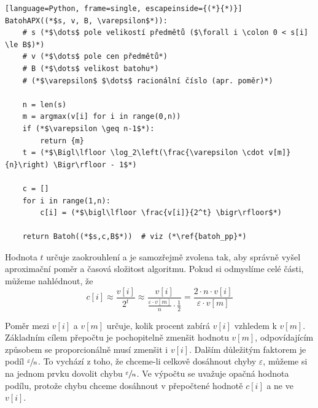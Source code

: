 \documentclass[11pt]{report} %
\numberwithin{equation}{section}
\begin{document}
\begin{minipage}{\linewidth}
	\label{batoh_apx}
	\begin{lstlisting}[language=Python, frame=single, escapeinside={(*}{*)}]
BatohAPX((*$s, v, B, \varepsilon$*)): 
	# s (*$\dots$ pole velikostí předmětů ($\forall i \colon 0 < s[i] \le B$)*)
	# v (*$\dots$ pole cen předmětů*)
	# B (*$\dots$ velikost batohu*)
	# (*$\varepsilon$ $\dots$ racionální číslo (apr. poměr)*)
	
	n = len(s)
	m = argmax(v[i] for i in range(0,n))
	if (*$\varepsilon \geq n-1$*):
		return {m}
	t = (*$\Bigl\lfloor \log_2\left(\frac{\varepsilon \cdot v[m]}{n}\right) \Bigr\rfloor - 1$*)
	
	c = []
	for i in range(1,n):
		c[i] = (*$\bigl\lfloor \frac{v[i]}{2^t} \bigr\rfloor$*)
	
	return Batoh((*$s,c,B$*))  # viz (*\ref{batoh_pp}*)
	\end{lstlisting}
\end{minipage}
\bigskip
Hodnota $t$ určuje zaokrouhlení a je samozřejmě zvolena tak, aby správně vyšel aproximační poměr a časová složitost algoritmu. Pokud si odmyslíme celé části, můžeme nahlédnout, že
$$c[i] \approx \frac{v[i]}{2^t} \approx \frac{v[i]}{\frac{\varepsilon \cdot v[m]}{n}\cdot \frac{1}{2}} = \frac{2 \cdot n \cdot v[i]}{\varepsilon \cdot v[m]}$$

Poměr mezi $v[i]$ a $v[m]$ určuje, kolik procent zabírá $v[i]$ vzhledem k $v[m]$. Základním cílem přepočtu je pochopitelně zmenšit hodnotu $v[m]$, odpovídajícím způsobem se proporcionálně musí zmenšit i $v[i]$. Dalším důležitým faktorem je podíl $\sfrac{\varepsilon}{n}$. To vychází z toho, že chceme-li celkově dosáhnout chyby $\varepsilon$, můžeme si na jednom prvku dovolit chybu $\sfrac{\varepsilon}{n}$. Ve výpočtu se uvažuje opačná hodnota podílu, protože chybu chceme dosáhnout v přepočtené hodnotě $c[i]$ a ne ve $v[i]$.
\end{document}

